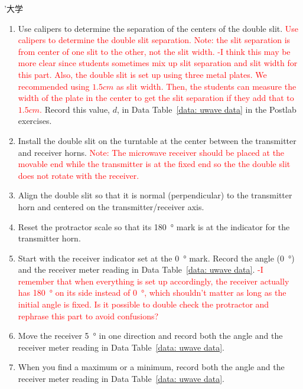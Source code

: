 ’大学\documentclass[addpoints]{physlabs}
\begin{document}
\begin{labsection}
\begin{experiment}
    \begin{enumerate}
        \item Use calipers to determine the separation of the centers of the double slit.
        \textcolor{red}{Use calipers to determine the double slit separation. Note: the slit separation is from center of one slit to the other, not the slit width. -I think this may be more clear since students sometimes mix up slit separation and slit width for this part. Also, the double slit is set up using three metal plates. We recommended using $1.5cm$ as slit width. Then, the students can measure the width of the plate in the center to get the slit separation if they add that to $1.5cm$.}
        Record this value, $d$, in Data Table~\ref{data: uwave data} in the Postlab exercises.

        \item Install the double slit on the turntable at the center between the transmitter and receiver horns. \textcolor{red}{Note: The microwave receiver should be placed at the movable end while the transmitter is at the fixed end so the the double slit does not rotate with the receiver.}
        
        \item Align the double slit so that it is normal (perpendicular) to the transmitter horn and centered on the transmitter/receiver axis.
        
        \item Reset the protractor scale so that its \qty{180}{\degree} mark is at the indicator for the transmitter horn.
        
        \item Start with the receiver indicator set at the \qty{0}{\degree} mark. Record the angle (\qty{0}{\degree}) and the receiver meter reading in Data Table~\ref{data: uwave data}. \textcolor{red}{-I remember that when everything is set up accordingly, the receiver actually has \qty{180}{\degree} on its side instead of \qty{0}{\degree}, which shouldn't matter as long as the initial angle is fixed. Is it possible to double check the protractor and rephrase this part to avoid confusions?}
        
        \item Move the receiver \qty{5}{\degree} in one direction and record both the angle and the receiver meter reading in Data Table~\ref{data: uwave data}.
        
        \item  When you find a maximum or a minimum, record both the angle and the receiver meter reading in Data Table~\ref{data: uwave data}.
        

\end{enumerate}
\end{experiment}
\end{labsection}
\end{document}
